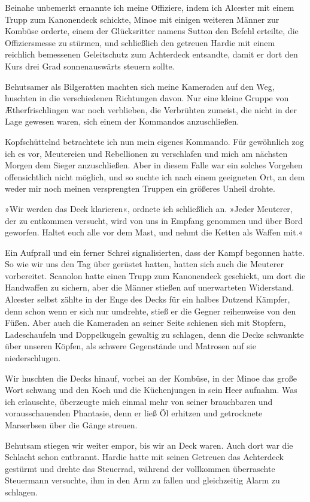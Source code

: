 Beinahe unbemerkt ernannte ich meine Offiziere, indem ich Alcester
mit einem Trupp zum Kanonendeck schickte, Minoe mit einigen
weiteren Männer zur Kombüse orderte, einem der Glücksritter namens
Sutton den Befehl erteilte, die Offiziersmesse zu stürmen, und
schließlich den getreuen Hardie mit einem reichlich bemessenen
Geleitschutz zum Achterdeck entsandte, damit er dort den Kurs drei
Grad sonnenauswärts steuern sollte.

Behutsamer als Bilgeratten machten sich meine Kameraden auf den
Weg, huschten in die verschiedenen Richtungen davon. Nur eine
kleine Gruppe von Ætherfrischlingen war noch verblieben, die
Verbrühten zumeist, die nicht in der Lage gewesen waren, sich einem
der Kommandos anzuschließen.

Kopfschüttelnd betrachtete ich nun mein eigenes Kommando. Für
gewöhnlich zog ich es vor, Meutereien und Rebellionen zu
verschlafen und mich am nächsten Morgen dem Sieger anzuschließen.
Aber in diesem Falle war ein solches Vorgehen offensichtlich nicht
möglich, und so suchte ich nach einem geeigneten Ort, an dem weder
mir noch meinen versprengten Truppen ein größeres Unheil drohte.

»Wir werden das Deck klarieren«, ordnete ich schließlich an. »Jeder
Meuterer, der zu entkommen versucht, wird von uns in Empfang
genommen und über Bord geworfen. Haltet euch alle vor dem Mast, und
nehmt die Ketten als Waffen mit.«

Ein Aufprall und ein ferner Schrei signalisierten, dass der Kampf
begonnen hatte. So wie wir uns den Tag über gerüstet hatten, hatten
sich auch die Meuterer vorbereitet. Scanolon hatte einen Trupp zum
Kanonendeck geschickt, um dort die Handwaffen zu sichern, aber die
Männer stießen auf unerwarteten Widerstand. Alcester selbst zählte
in der Enge des Decks für ein halbes Dutzend Kämpfer, denn schon
wenn er sich nur umdrehte, stieß er die Gegner reihenweise von den
Füßen. Aber auch die Kameraden an seiner Seite schienen sich mit
Stopfern, Ladeschaufeln und Doppelkugeln gewaltig zu schlagen, denn
die Decke schwankte über unseren Köpfen, als schwere Gegenstände
und Matrosen auf sie niederschlugen.

Wir huschten die Decks hinauf, vorbei an der Kombüse, in der Minoe
das große Wort schwang und den Koch und die Küchenjungen in sein
Heer aufnahm. Was ich erlauschte, überzeugte mich einmal mehr von
seiner brauchbaren und vorausschauenden Phantasie, denn er ließ Öl
erhitzen und getrocknete Marserbsen über die Gänge streuen.

Behutsam stiegen wir weiter empor, bis wir an Deck waren. Auch dort
war die Schlacht schon entbrannt. Hardie hatte mit seinen Getreuen
das Achterdeck gestürmt und drehte das Steuerrad, während der
vollkommen überraschte Steuermann versuchte, ihm in den Arm zu
fallen und gleichzeitig Alarm zu schlagen.

